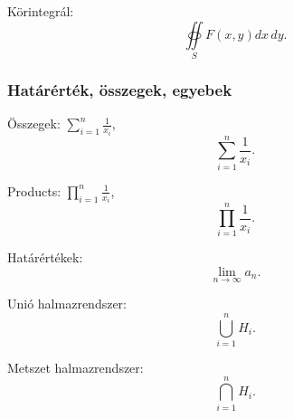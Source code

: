 \documentclass[a4paper,12pt]{article}
\begin{document}
Körintegrál: $$\oiint\limits_{S} F\left(x,y\right) dx\,dy.$$

\subsubsection{Határérték, összegek, egyebek}

Összegek: $\sum\limits^n_{i=1} \frac{1}{x_i}$, $$\sum\limits^n_{i=1} \frac{1}{x_i}.$$

Products: $\prod\limits^n_{i=1} \frac{1}{x_i}$, $$\prod\limits^n_{i=1} \frac{1}{x_i}.$$

Határértékek: $$\lim\limits_{n \to \infty} a_n.$$

Unió halmazrendszer: $$\bigcup\limits_{i=1}^{n} H_{i}.$$

Metszet halmazrendszer: $$\bigcap\limits_{i=1}^{n} H_{i}.$$
\end{document}
